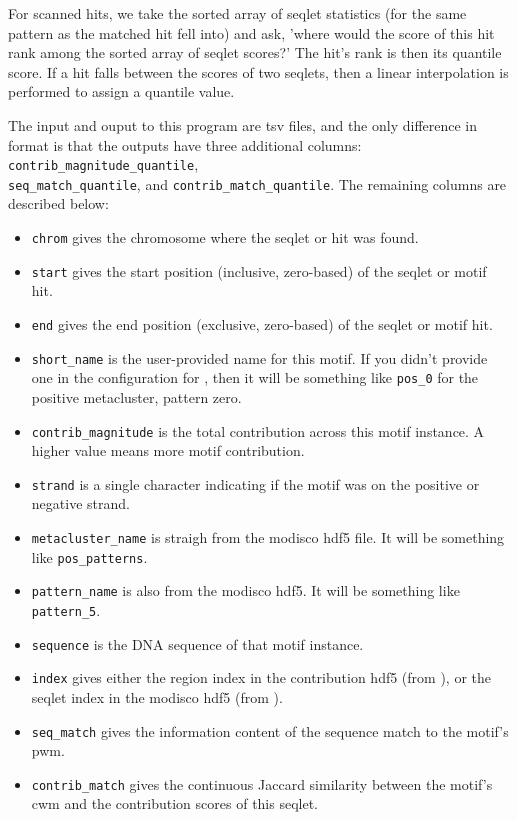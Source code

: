 \documentclass{article}
\begin{document}
For scanned hits, we take the sorted array of seqlet statistics (for the same pattern
as the matched hit fell into) and ask, 'where would the score of this hit rank among
the sorted array of seqlet scores?'
The hit's rank is then its quantile score.
If a hit falls between the scores of two seqlets, then a linear interpolation
is performed to assign a quantile value.

The input and ouput to this program are tsv files, and the only difference in format
is that the outputs have three additional columns: \texttt{contrib\_magnitude\_quantile},\\
\texttt{seq\_match\_quantile}, and
\texttt{contrib\_match\_quantile}.
The remaining columns are described below:

\begin{itemize}
    \item \texttt{chrom} gives the chromosome where the seqlet or hit was found.
    \item \texttt{start} gives the start position (inclusive, zero-based) of the seqlet or
        motif hit.
    \item \texttt{end} gives the end position (exclusive, zero-based) of the seqlet or motif hit.
    \item \begin{sloppypar}\texttt{short\_name} is the user-provided name for this motif. If you didn't provide
        one in the configuration for , then it will be something like \texttt{pos\_0}
    for the positive metacluster, pattern zero.\end{sloppypar}
    \item \texttt{contrib\_magnitude} is the total contribution across this motif instance.
        A higher value means more motif contribution.
    \item \texttt{strand} is a single character indicating if the motif was on the positive
        or negative strand.
    \item \texttt{metacluster\_name} is straigh from the modisco hdf5 file. It will be
        something like \texttt{pos\_patterns}.
    \item \texttt{pattern\_name} is also from the modisco hdf5. It will be something
        like \texttt{pattern\_5}.
    \item \texttt{sequence} is the DNA sequence of that motif instance.
    \item \texttt{index} gives either the region index in the contribution hdf5
        (from ), or the seqlet index in the modisco
        hdf5 (from ).
    \item \texttt{seq\_match} gives the information content of the sequence match to the motif's
        pwm.
    \item \texttt{contrib\_match} gives the continuous Jaccard similarity between the motif's
        cwm and the contribution scores of this seqlet.
\end{itemize}
\end{document}

